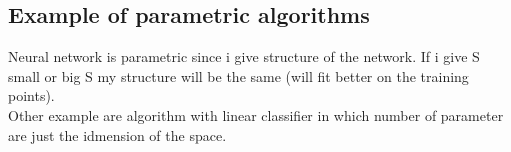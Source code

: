 \documentclass[../main.tex]{subfiles}
\begin{document}
\subsection{Example of parametric algorithms}
Neural network is parametric since i give structure of the network.
If i give S small or big S my structure will be the same (will fit better on the training points).
\\
Other example are algorithm with linear classifier in which number of parameter are just the idmension of the space.
\end{document}
